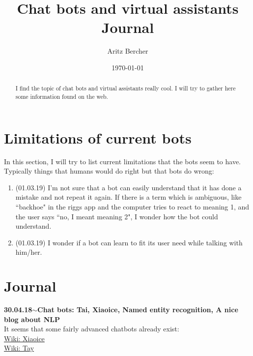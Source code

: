 \documentclass[11pt,a4paper]{article}
\title{Chat bots and virtual assistants\\ Journal}
\author{Aritz Bercher}
\date{\today}
\newenvironment{loggentry}[2]%
{\noindent\textbf{#1}\hspace{1cm}$\mathbf{\sim}$\text{ }\textbf{#2}\\}{\vspace{0.5cm}}
\begin{document}
\maketitle

\begin{abstract}
I find the topic of chat bots and virtual assistants really cool. I will try to gather here some information found on the web.
\end{abstract}

\section{Limitations of current bots}

In this section, I will try to list current limitations that the bots seem to have. Typically things that humans would do right but that bots do wrong:
\begin{enumerate}
\item (01.03.19) I'm not sure that a bot can easily understand that it has done a mistake and not repeat it again. If there is a term which is ambiguous, like ``backhoe" in the riggs app and the computer tries to react to meaning 1, and the user says ``no, I meant meaning 2", I wonder how the bot could understand.
\item (01.03.19) I wonder if a bot can learn to fit its user need while talking with him/her.
\end{enumerate}

\section{Journal}

\begin{loggentry}{30.04.18}{Chat bots: Tai, Xiaoice, Named entity recognition, A nice blog about NLP}
It seems that some fairly advanced chatbots already exist:\\
\href{https://en.wikipedia.org/wiki/Xiaoice}{Wiki: Xiaoice}\\
\href{https://en.wikipedia.org/wiki/Tay_(bot)}{Wiki: Tay}\\
\end{loggentry}
\end{document}
